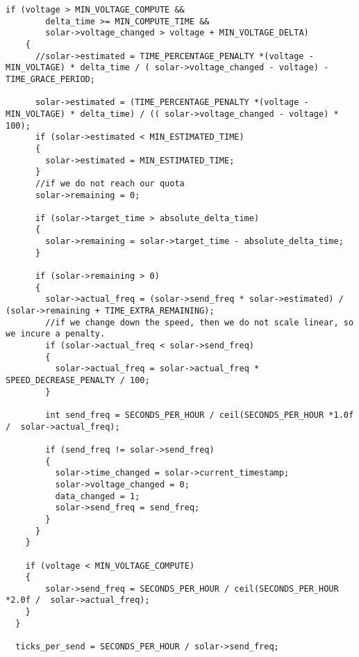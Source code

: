 \begin{lstlisting}[frame=single]
    if (voltage > MIN_VOLTAGE_COMPUTE &&
        delta_time >= MIN_COMPUTE_TIME &&
        solar->voltage_changed > voltage + MIN_VOLTAGE_DELTA)
    {
      //solar->estimated = TIME_PERCENTAGE_PENALTY *(voltage - MIN_VOLTAGE) * delta_time / ( solar->voltage_changed - voltage) - TIME_GRACE_PERIOD;

      solar->estimated = (TIME_PERCENTAGE_PENALTY *(voltage - MIN_VOLTAGE) * delta_time) / (( solar->voltage_changed - voltage) * 100);
      if (solar->estimated < MIN_ESTIMATED_TIME)
      {
        solar->estimated = MIN_ESTIMATED_TIME;
      }
      //if we do not reach our quota
      solar->remaining = 0;

      if (solar->target_time > absolute_delta_time)
      {
        solar->remaining = solar->target_time - absolute_delta_time;
      }

      if (solar->remaining > 0)
      {
        solar->actual_freq = (solar->send_freq * solar->estimated) / (solar->remaining + TIME_EXTRA_REMAINING);
        //if we change down the speed, then we do not scale linear, so we incure a penalty.
        if (solar->actual_freq < solar->send_freq)
        {
          solar->actual_freq = solar->actual_freq * SPEED_DECREASE_PENALTY / 100;
        }

        int send_freq = SECONDS_PER_HOUR / ceil(SECONDS_PER_HOUR *1.0f /  solar->actual_freq);

        if (send_freq != solar->send_freq)
        {
          solar->time_changed = solar->current_timestamp;
          solar->voltage_changed = 0;
          data_changed = 1;
          solar->send_freq = send_freq;
        }
      }
    }

    if (voltage < MIN_VOLTAGE_COMPUTE)
    {
        solar->send_freq = SECONDS_PER_HOUR / ceil(SECONDS_PER_HOUR *2.0f /  solar->actual_freq);
    }
  }

  ticks_per_send = SECONDS_PER_HOUR / solar->send_freq;

\end{lstlisting}




